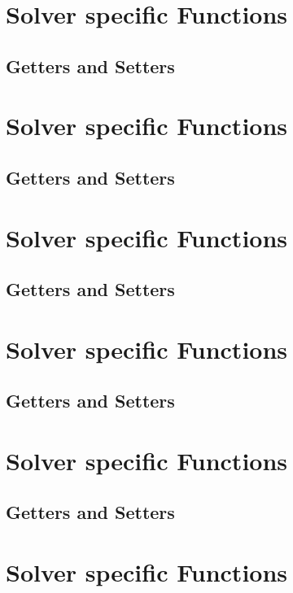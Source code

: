 \FloatBarrier
\section{\direct Solver specific Functions}


\FloatBarrier
\subsection{Getters and Setters}

\FloatBarrier
\section{\ewald Solver specific Functions}


\FloatBarrier
\subsection{Getters and Setters}

\FloatBarrier
\section{\fmm Solver specific Functions}


\FloatBarrier
\subsection{Getters and Setters}

\FloatBarrier
\section{\memd Solver specific Functions}


\FloatBarrier
\subsection{Getters and Setters}

\FloatBarrier
\section{\mmmoned Solver specific Functions}


\FloatBarrier
\subsection{Getters and Setters}

\FloatBarrier
\section{\mmmtwod Solver specific Functions}


